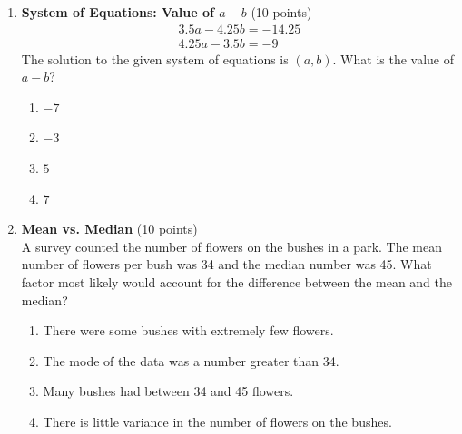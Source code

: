 \begin{enumerate}
  \item \textbf{System of Equations: Value of $a-b$} (10 points)\\
  \[
    \begin{gathered}
      3.5a - 4.25b = -14.25 \\
      4.25a - 3.5b = -9
    \end{gathered}
  \]
  The solution to the given system of equations is $(a, b)$. What is the value of $a-b$?
  \begin{enumerate}[label=\Alph*.]
    \item $-7$
    \item $-3$
    \item $5$
    \item $7$
  \end{enumerate}
  \begin{subanswer}
  \end{subanswer}

  \item \textbf{Mean vs. Median} (10 points)\\
  A survey counted the number of flowers on the bushes in a park. The mean number of flowers per bush was 34 and the median number was 45. What factor most likely would account for the difference between the mean and the median?
  \begin{enumerate}[label=\Alph*.]
    \item There were some bushes with extremely few flowers.
    \item The mode of the data was a number greater than 34.
    \item Many bushes had between 34 and 45 flowers.
    \item There is little variance in the number of flowers on the bushes.
  \end{enumerate}
  \begin{subanswer}
  \end{subanswer}

  \newpage


\end{enumerate}
